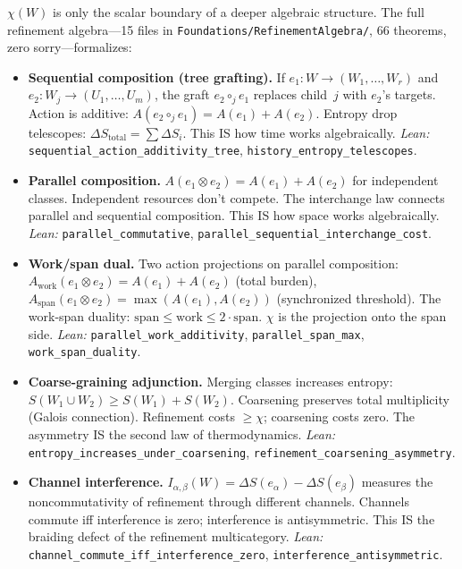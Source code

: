$\chi(W)$ is only the scalar boundary of a deeper algebraic structure.
The full refinement algebra---15 files in \texttt{Foundations/RefinementAlgebra/},
66 theorems, zero sorry---formalizes:
\begin{itemize}
\item \textbf{Sequential composition (tree grafting).}  If $e_1 : W \to (W_1,\ldots,W_r)$
  and $e_2 : W_j \to (U_1,\ldots,U_m)$, the graft $e_2 \circ_j e_1$ replaces child~$j$
  with $e_2$'s targets.  Action is additive: $A(e_2 \circ_j e_1) = A(e_1) + A(e_2)$.
  Entropy drop telescopes: $\Delta S_{\mathrm{total}} = \sum \Delta S_i$.
  This IS how time works algebraically.
  \emph{Lean:} \texttt{sequential\_action\_additivity\_tree}, \texttt{history\_entropy\_telescopes}.

\item \textbf{Parallel composition.}  $A(e_1 \otimes e_2) = A(e_1) + A(e_2)$
  for independent classes.  Independent resources don't compete.
  The interchange law connects parallel and sequential composition.
  This IS how space works algebraically.
  \emph{Lean:} \texttt{parallel\_commutative}, \texttt{parallel\_sequential\_interchange\_cost}.

\item \textbf{Work/span dual.}  Two action projections on parallel composition:
  $A_{\mathrm{work}}(e_1 \otimes e_2) = A(e_1) + A(e_2)$ (total burden),
  $A_{\mathrm{span}}(e_1 \otimes e_2) = \max(A(e_1), A(e_2))$ (synchronized threshold).
  The work-span duality: $\mathrm{span} \leq \mathrm{work} \leq 2 \cdot \mathrm{span}$.
  $\chi$ is the projection onto the span side.
  \emph{Lean:} \texttt{parallel\_work\_additivity}, \texttt{parallel\_span\_max}, \texttt{work\_span\_duality}.

\item \textbf{Coarse-graining adjunction.}  Merging classes increases entropy:
  $S(W_1 \cup W_2) \geq S(W_1) + S(W_2)$.  Coarsening preserves total multiplicity (Galois
  connection).  Refinement costs $\geq \chi$; coarsening costs zero.
  The asymmetry IS the second law of thermodynamics.
  \emph{Lean:} \texttt{entropy\_increases\_under\_coarsening}, \texttt{refinement\_coarsening\_asymmetry}.

\item \textbf{Channel interference.}  $I_{\alpha,\beta}(W) = \Delta S(e_\alpha) - \Delta S(e_\beta)$
  measures the noncommutativity of refinement through different channels.
  Channels commute iff interference is zero; interference is antisymmetric.
  This IS the braiding defect of the refinement multicategory.
  \emph{Lean:} \texttt{channel\_commute\_iff\_interference\_zero}, \texttt{interference\_antisymmetric}.


\end{itemize}
